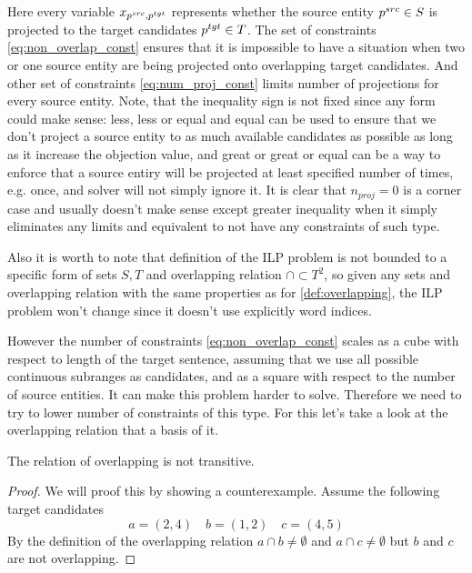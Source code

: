 Here every variable \( x_{p^{src}, p^{tgt}} \) represents whether the source entity \( p^{src} \in S \)
is projected to the target candidates \( p^{tgt} \in T \).
The set of constraints \eqref{eq:non_overlap_const} ensures that it is impossible to have a situation when
two or one source entity are being projected onto overlapping target candidates.
And other set of constraints \eqref{eq:num_proj_const} limits number of projections
for every source entity. Note, that the inequality sign is not fixed since any form
could make sense: less, less or equal and equal can be used to ensure that we don't
project a source entity to as much available candidates as possible as long as it
increase the objection value, and great or great or equal can be a way to enforce
that a source entiry will be projected at least specified number of times, e.g. once,
and solver will not simply ignore it. It is clear that \( n_{proj} = 0 \) is a corner
case and usually doesn't make sense except greater inequality when it simply
eliminates any limits and equivalent to not have any constraints of such type.

Also it is worth to note that definition of the ILP problem is not bounded to a specific form of sets \( S, T \)
and overlapping relation \( \cap \subset T^2 \), so given any sets and overlapping relation with the same properties
as for \ref{def:overlapping}, the ILP problem won't change since it doesn't use explicitly word indices.

However the number of constraints \eqref{eq:non_overlap_const} scales as a cube with respect to
length of the target sentence, assuming that we use all possible continuous subranges as candidates, and as
a square with respect to the number of source entities.
It can make this problem harder to solve. Therefore we need to try to lower number of constraints
of this type. For this let's take a look at the overlapping relation that a basis of it.
\begin{lemma} \label{lemma:not_transitive}
  The relation of overlapping is not transitive.
\end{lemma}
\begin{proof}
  We will proof this by showing a counterexample.
  Assume the following target candidates
  \[
    a = (2, 4) \quad b = (1, 2) \quad c = (4, 5)
  \]
  By the definition of the overlapping relation \( a \cap b \neq \emptyset \) and
  \( a \cap c \neq \emptyset \) but \( b \) and \( c \) are not overlapping.
\end{proof}

